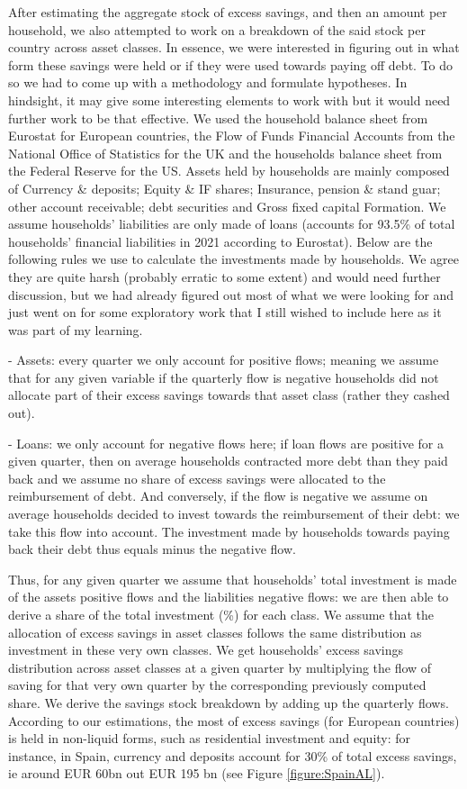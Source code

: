 \quad After estimating the aggregate stock of excess savings, and then an amount per household, we also attempted to work on a breakdown of the said stock per country across asset classes. 
In essence, we were interested in figuring out in what form these savings were held or if they were used towards paying off debt. To do so we had to come up with a methodology and formulate hypotheses. 
In hindsight, it may give some interesting elements to work with but it would need further work to be that effective. 
We used the household balance sheet from Eurostat for European countries, the Flow of Funds Financial Accounts from the National Office of Statistics for the UK and the households balance sheet from the Federal Reserve for the US. 
Assets held by households are mainly composed of Currency \& deposits; Equity \& IF shares; Insurance, pension \& stand guar; other account receivable;	debt securities and Gross fixed capital Formation. We assume households’ liabilities are only made of loans (accounts for 93.5\% of total households' financial liabilities in 2021 according to Eurostat). 
Below are the following rules we use to calculate the investments made by households. We agree they are quite harsh (probably erratic to some extent) and would need further discussion, but we had already figured out most of what we were looking for and just went on for some exploratory work that I still wished to include here as it was part of my learning.

- Assets: every quarter we only account for positive flows; meaning we assume that for any given variable if the quarterly flow is negative households did not allocate part of their excess savings towards that asset class (rather they cashed out).

- Loans: we only account for negative flows here; if loan flows are positive for a given quarter, then on average households contracted more debt than they paid back and we assume no share of excess savings were allocated to the reimbursement of debt. 
And conversely, if the flow is negative we assume on average households decided to invest towards the reimbursement of their debt: we take this flow into account. The investment made by households towards paying back their debt thus equals minus the negative flow. 

Thus, for any given quarter we assume that households' total investment is made of the assets positive flows and the liabilities negative flows: we are then able to derive a share of the total investment (\%) for each class. 
We assume that the allocation of excess savings in asset classes follows the same distribution as investment in these very own classes. 
We get households' excess savings distribution across asset classes at a given quarter by multiplying the flow of saving for that very own quarter by the corresponding previously computed share. 
We derive the savings stock breakdown by adding up the quarterly flows. According to our estimations, the most of excess savings (for European countries) is held in non-liquid forms, such as residential investment and equity: for instance, in Spain, currency and deposits account for 30\% of total excess savings, ie around EUR 60bn out EUR 195 bn (see Figure \ref{figure:SpainAL}). 


